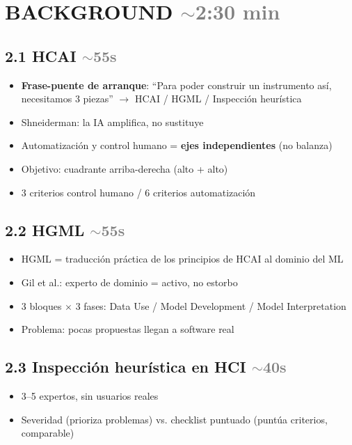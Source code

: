 \documentclass[10pt,a4paper]{article}
\newcommand{\tiempo}[1]{\hfill\normalfont\small\textcolor{gray}{$\sim$#1}}
\newcommand{\clave}[1]{\textbf{#1}}
\begin{document}
\section{BACKGROUND \tiempo{2:30 min}}

\subsection*{2.1 HCAI \tiempo{55s}}
\begin{itemize}
    \item \clave{Frase-puente de arranque}: ``Para poder construir un instrumento así, necesitamos 3 piezas'' $\rightarrow$ HCAI / HGML / Inspección heurística
    \item Shneiderman: la IA amplifica, no sustituye
    \item Automatización y control humano = \textbf{ejes independientes} (no balanza)
    \item Objetivo: cuadrante arriba-derecha (alto + alto)
    \item 3 criterios control humano / 6 criterios automatización
\end{itemize}

\subsection*{2.2 HGML \tiempo{55s}}
\begin{itemize}
    \item HGML = traducción práctica de los principios de HCAI al dominio del ML
    \item Gil et al.: experto de dominio = activo, no estorbo
    \item 3 bloques $\times$ 3 fases: Data Use / Model Development / Model Interpretation
    \item Problema: pocas propuestas llegan a software real
\end{itemize}

\subsection*{2.3 Inspección heurística en HCI \tiempo{40s}}
\begin{itemize}
    \item 3--5 expertos, sin usuarios reales
    \item Severidad (prioriza problemas) vs. checklist puntuado (puntúa criterios, comparable)
\end{itemize}
\end{document}
